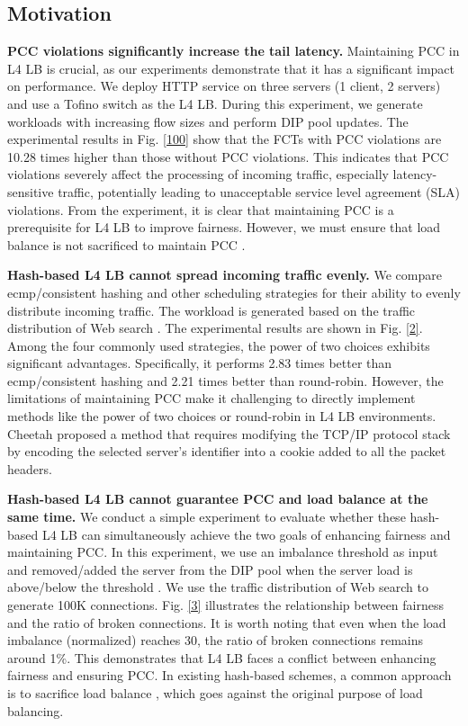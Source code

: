 \subsection{Motivation}
\textbf{PCC violations significantly increase the tail latency.} Maintaining PCC in L4 LB is crucial, as our experiments demonstrate that it has a significant impact on performance. We deploy HTTP service on three servers (1 client, 2 servers) and use a Tofino switch as the L4 LB. During this experiment, we generate workloads with increasing flow sizes and perform DIP pool updates. The experimental results in Fig. \ref{100} show that the FCTs with PCC violations are 10.28 times higher than those without PCC violations. This indicates that PCC violations severely affect the processing of incoming traffic, especially latency-sensitive traffic, potentially leading to unacceptable service level agreement (SLA) violations. From the experiment, it is clear that maintaining PCC is a prerequisite for L4 LB to improve fairness. However, we must ensure that load balance is not sacrificed to maintain PCC \cite{barbette2020high}.

\textbf{Hash-based L4 LB cannot spread incoming traffic evenly.} We compare ecmp/consistent hashing and other scheduling strategies for their ability to evenly distribute incoming traffic. The workload is generated based on the traffic distribution of Web search \cite{alizadeh2010data}. The experimental results are shown in Fig. \ref{2}. Among the four commonly used strategies, the power of two choices exhibits significant advantages. Specifically, it performs 2.83 times better than ecmp/consistent hashing and 2.21 times better than round-robin. However, the limitations of maintaining PCC make it challenging to directly implement methods like the power of two choices or round-robin in L4 LB environments. Cheetah proposed a method that requires modifying the TCP/IP protocol stack by encoding the selected server’s identifier into a cookie added to all the packet headers.

\textbf{Hash-based L4 LB cannot guarantee PCC and load balance at the same time.} We conduct a simple experiment to evaluate whether these hash-based L4 LB can simultaneously achieve the two goals of enhancing fairness and maintaining PCC. In this experiment, we use an imbalance threshold as input and removed/added the server from the DIP pool when the server load is above/below the threshold \cite{barbette2021cheetah}. We use the traffic distribution of Web search to generate 100K connections. Fig. \ref{3} illustrates the relationship between fairness and the ratio of broken connections. It is worth noting that even when the load imbalance (normalized) reaches 30, the ratio of broken connections remains around 1\%. This demonstrates that L4 LB faces a conflict between enhancing fairness and ensuring PCC. In existing hash-based schemes, a common approach is to sacrifice load balance \cite{eisenbud2016maglev, olteanu2018stateless}, which goes against the original purpose of load balancing.

